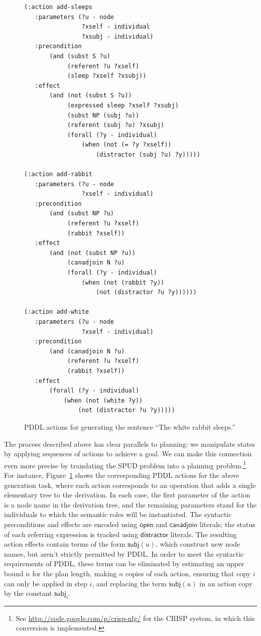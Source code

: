 \documentclass[letterpaper]{article}
\begin{document}
\begin{figure}[p]
\centering
\begin{minipage}{0.5\textwidth}
{\small%
\begin{verbatim}
(:action add-sleeps
   :parameters (?u - node
                ?xself - individual
                ?xsubj - individual)
   :precondition
       (and (subst S ?u)
            (referent ?u ?xself)
            (sleep ?xself ?xsubj))
   :effect 
       (and (not (subst S ?u))
            (expressed sleep ?xself ?xsubj)
            (subst NP (subj ?u))
            (referent (subj ?u) ?xsubj)
            (forall (?y - individual)
                (when (not (= ?y ?xself))
                    (distractor (subj ?u) ?y)))))

(:action add-rabbit
   :parameters (?u - node
                ?xself - individual)
   :precondition 
       (and (subst NP ?u)
            (referent ?u ?xself)
            (rabbit ?xself))
   :effect 
       (and (not (subst NP ?u))
            (canadjoin N ?u)
            (forall (?y - individual)
                (when (not (rabbit ?y))
                    (not (distractor ?u ?y))))))

(:action add-white
   :parameters (?u - node
                ?xself - individual)
   :precondition 
       (and (canadjoin N ?u)
            (referent ?u ?xself)
            (rabbit ?xself))
   :effect 
       (forall (?y - individual)
           (when (not (white ?y))
               (not (distractor ?u ?y)))))
\end{verbatim}}%
\end{minipage}
\caption{PDDL actions for generating the sentence ``The white rabbit
sleeps.''}
\label{fig:white-rabbit-as-planning}
\end{figure}


The process described above has clear parallels to planning: we manipulate
states by applying sequences of actions to achieve a goal. We can make this
connection even more precise by translating the SPUD problem into a
planning problem.\footnote{See
  \url{http://code.google.com/p/crisp-nlg/} for the CRISP system, in
  which this conversion is implemented.}  For instance,
Figure~\ref{fig:white-rabbit-as-planning} shows the corresponding PDDL
actions for the above generation task, where each action corresponds
to an operation that adds a single elementary tree to the derivation.
In each case, the first parameter of the action is a node name in the
derivation tree, and the remaining parameters stand for the
individuals to which the semantic roles will be instantiated.  The
syntactic preconditions and effects are encoded using $\mathsf{open}$
and $\mathsf{canadjoin}$ literals; the status of each referring expression
is tracked using $\mathsf{distractor}$ literals. The resulting action
effects contain terms of the form $\mathsf{subj}(u)$, which construct new
node names, but aren't strictly permitted by PDDL. In order to meet the
syntactic requirements of PDDL, these terms can be eliminated by estimating
an upper bound $n$ for the plan length, making $n$ copies of each action,
ensuring that copy $i$ can only be applied in step $i$, and replacing the
term $\mathsf{subj}(u)$ in an action copy by the constant
$\mathsf{subj}_i$.
\end{document}

